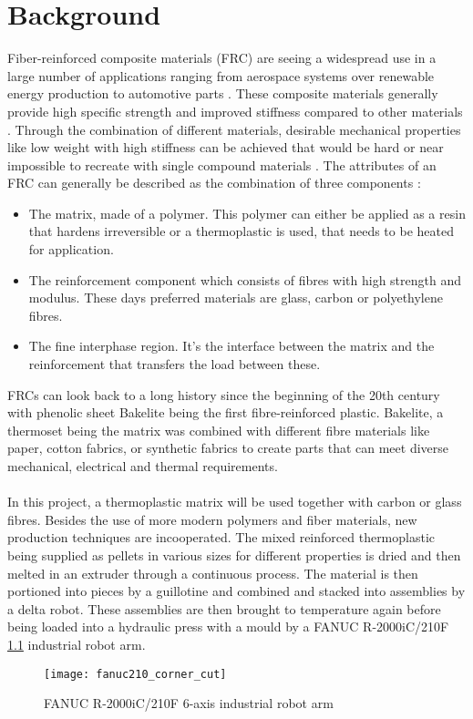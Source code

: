 
\chapter{Background}

Fiber-reinforced composite materials (FRC) are seeing a widespread use in a large number of applications ranging from aerospace systems over renewable energy production to automotive parts \cite{park2011interface} \cite{HighPerformanceTextiles}. 
These composite materials generally provide high specific strength and improved stiffness compared to other materials \cite{GeneralizedContinuumMechanics}. 
Through the combination of different materials, desirable mechanical properties like low weight with high stiffness can be achieved that would be hard or near impossible to recreate with single compound materials \cite{AdvancesDamageMechanics}. 
The attributes of an FRC can generally be described as the combination of three components \cite{AdvancedDentalBiomaterials}: \\
\begin{itemize}
	\item The matrix, made of a polymer. 
	This polymer can either be applied as a resin that hardens irreversible or a thermoplastic is used, that needs to be heated for application.
	\item The reinforcement component which consists of fibres with high strength and modulus. 
	These days preferred materials are glass, carbon or polyethylene fibres.
	\item The fine interphase region. 
	It's the interface between the matrix and the reinforcement that transfers the load between these.	
\end{itemize}
%
FRCs can look back to a long history since the beginning of the 20th century with phenolic sheet Bakelite being the first fibre-reinforced plastic. 
Bakelite, a thermoset being the matrix was combined with different fibre materials like paper, cotton fabrics, or synthetic fabrics to create parts that can meet diverse mechanical, electrical and thermal requirements.
\cite{BakelitePhenolics}\\
\\
In this project, a thermoplastic matrix will be used together with carbon or glass fibres. 
Besides the use of more modern polymers and fiber materials, new production techniques are incooperated.
The mixed reinforced thermoplastic being supplied as pellets in various sizes for different properties is dried and then melted in an extruder through a continuous process. 
The material is then portioned into pieces by a guillotine and combined and stacked into assemblies by a delta robot. 
These assemblies are then brought to temperature again before being loaded into a hydraulic press with a mould by a FANUC R-2000iC/210F \ref{fig:fanuc210} industrial robot arm.
\cite{SystemRequirements}

\begin{figure}[h]
	\centering
	\texttt{[image: fanuc210\_corner\_cut]}
	\caption{FANUC R-2000iC/210F 6-axis industrial robot arm}
	\label{fig:fanuc210}
\end{figure}





